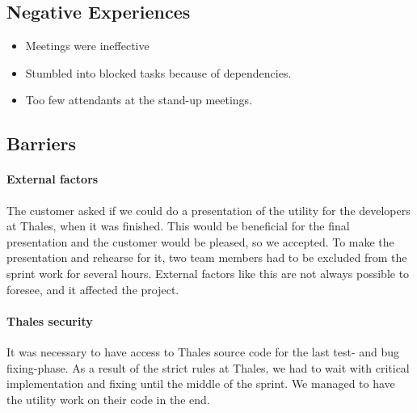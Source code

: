 \subsection{Negative Experiences}
\begin{itemize}
	\item Meetings were ineffective
	\item Stumbled into blocked tasks because of dependencies.
	\item Too few attendants at the stand-up meetings.
\end{itemize}

\subsection{Barriers}

\paragraph{External factors}
The customer asked if we could do a presentation of the utility for the developers at Thales, when it was finished. This would be beneficial for the final presentation and the customer would be pleased, so we accepted. To make the presentation and rehearse for it, two team members had to be excluded from the sprint work for several hours. External factors like this are not always possible to foresee, and it affected the project.

\paragraph{Thales security}
It was necessary to have access to Thales source code for the last test- and bug fixing-phase. As a result of the strict rules at Thales, we had to wait with critical implementation and fixing until the middle of the sprint. We managed to have the utility work on their code in the end.

